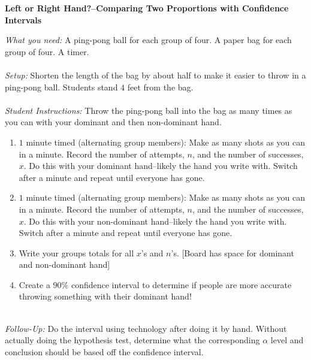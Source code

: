 \documentclass[12pt]{amsart}
\theoremstyle{definition}
\begin{document}
   \begin{framed}
   	\begin{center} \textbf{Left or Right Hand?--Comparing Two Proportions with Confidence Intervals} \end{center}
   	\emph{What you need:} A ping-pong ball for each group of four. A paper bag for each group of four. A timer.\\
   	~\\
   	\emph{Setup:} Shorten the length of the bag by about half to make it easier to throw in a ping-pong ball. Students stand $4$ feet from the bag.\\
   	~\\
   	\emph{Student Instructions:} Throw the ping-pong ball into the bag as many times as you can with your dominant and then non-dominant hand.
   	\begin{enumerate}
   		\item $1$ minute timed (alternating group members): Make as many shots as you can in a minute. Record the number of attempts, $n$, and the number of successes, $x$. Do this with your dominant hand--likely the hand you write with. Switch after a minute and repeat until everyone has gone.
   		\item $1$ minute timed (alternating group members): Make as many shots as you can in a minute. Record the number of attempts, $n$, and the number of successes, $x$. Do this with your non-dominant hand--likely the hand you write with. Switch after a minute and repeat until everyone has gone.
   		\item Write your groups totals for all $x$'s and $n$'s. [Board has space for dominant and non-dominant hand]
   		\item Create a $90\%$ confidence interval to determine if people are more accurate throwing something with their dominant hand!
   	\end{enumerate}
   	~\\
   	\emph{Follow-Up:} Do the interval using technology after doing it by hand. Without actually doing the hypothesis test, determine what the corresponding $\alpha$ level and conclusion should be based off the confidence interval.
   \end{framed}
   
   \newpage
   
\end{document}
